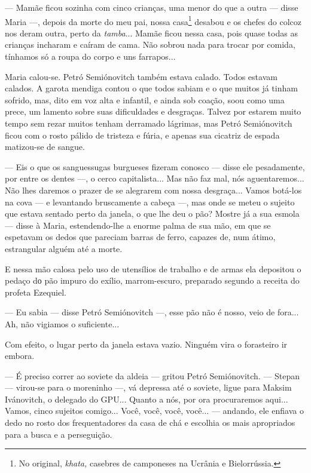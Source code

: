 --- Mamãe ficou sozinha com cinco crianças, uma menor do que a outra ---
disse Maria ---, depois da morte do meu pai, nossa casa\footnote{No
  original, \emph{khata,} casebres de camponeses na Ucrânia e
  Bielorrússia.} desabou e os chefes do colcoz nos deram outra, perto da
\emph{tamba}... Mamãe ficou nessa casa, pois quase todas as crianças
incharam e caíram de cama. Não sobrou nada para trocar por comida,
tínhamos só a roupa do corpo e uns farrapos...

Maria calou-se. Petró Semiónovitch também estava calado. Todos estavam
calados. A garota mendiga contou o que todos sabiam e o que muitos já
tinham sofrido, mas, dito em voz alta e infantil, e ainda sob coação,
soou como uma prece, um lamento sobre suas dificuldades e desgraças.
Talvez por estarem muito tempo sem rezar muitos tenham derramado
lágrimas, mas Petró Semiónovitch ficou com o rosto pálido de tristeza e
fúria, e apenas sua cicatriz de espada matizou-se de sangue.

--- Eis o que os sanguessugas burgueses fizeram conosco --- disse ele
pesadamente, por entre os dentes ---, o cerco capitalista... Mas não faz
mal, nós aguentaremos... Não lhes daremos o prazer de se alegrarem com
nossa desgraça... Vamos botá-los na cova --- e levantando bruscamente a
cabeça ---, mas onde se meteu o sujeito que estava sentado perto da
janela, o que lhe deu o pão? Mostre já a sua esmola --- disse à Maria,
estendendo-lhe a enorme palma de sua mão, em que se espetavam os dedos
que pareciam barras de ferro, capazes de, num átimo, estrangular alguém
até a morte.

E nessa mão calosa pelo uso de utensílios de trabalho e de armas ela
depositou o pedaço dо pão impuro do exílio, marrom-escuro, preparado
segundo a receita do profeta Ezequiel.

--- Eu sabia --- disse Petró Semiónovitch ---, esse pão não é nosso,
veio de fora... Ah, não vigiamos o suficiente...

Com efeito, o lugar perto da janela estava vazio. Ninguém vira o
forasteiro ir embora.

--- É preciso correr ao soviete da aldeia --- gritou Petró Semiónovitch.
--- Stepan --- virou-se para o moreninho ---, vá depressa até o soviete,
ligue para Maksim Ivánovitch, o delegado do GPU... Quanto a nós, por ora
procuraremos aqui... Vamos, cinco sujeitos comigo... Você, você, você,
você... --- andando, ele enfiava o dedo no rosto dos frequentadores da
casa de chá e escolhia os mais apropriados para a busca e a perseguição.

